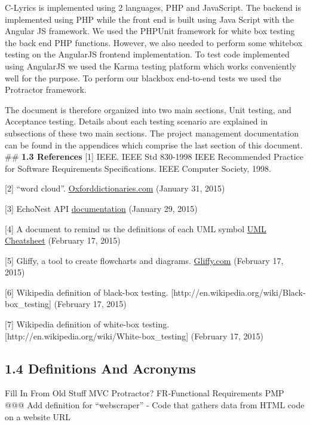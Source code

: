 \documentclass[]{article}
\begin{document}
C-Lyrics is implemented using 2 languages, PHP and JavaScript. The
backend is implemented using PHP while the front end is built using Java
Script with the Angular JS framework. We used the PHPUnit framework for
white box testing the back end PHP functions. However, we also needed to
perform some whitebox testing on the AngularJS frontend implementation.
To test code implemented using AngularJS we used the Karma testing
platform which works conveniently well for the purpose. To perform our
blackbox end-to-end tests we used the Protractor framework.

The document is therefore organized into two main sections, Unit
testing, and Acceptance testing. Details about each testing scenario are
explained in subsections of these two main sections. The project
management documentation can be found in the appendices which comprise
the last section of this document. \#\# \textbf{1.3 References} {[}1{]}
IEEE. IEEE Std 830-1998 IEEE Recommended Practice for Software
Requirements Specifications. IEEE Computer Society, 1998.

{[}2{]} ``word cloud''.
\href{http://www.oxforddictionaries.com/us/definition/american_english/word-cloud}{Oxforddictionaries.com}
(January 31, 2015)

{[}3{]} EchoNest API
\href{http://developer.echonest.com/docs/v4/index.html\#overview}{documentation}
(January 29, 2015)

{[}4{]} A document to remind us the definitions of each UML symbol
\href{http://loufranco.com/wp-content/uploads/2012/11/cheatsheet.pdf}{UML
Cheatsheet} (February 17, 2015)

{[}5{]} Gliffy, a tool to create flowcharts and diagrams.
\href{https://www.gliffy.com}{Gliffy.com} (February 17, 2015)

{[}6{]} Wikipedia definition of black-box testing.
{[}http://en.wikipedia.org/wiki/Black-box\_testing{]} (February 17,
2015)

{[}7{]} Wikipedia definition of white-box testing.
{[}http://en.wikipedia.org/wiki/White-box\_testing{]} (February 17,
2015)

\subsection{\textbf{1.4 Definitions And
Acronyms}}\label{definitions-and-acronyms}

Fill In From Old Stuff MVC Protractor? FR-Functional Requirements PMP
@@@ Add definition for ``webscraper'' - Code that gathers data from HTML
code on a website URL
\end{document}

